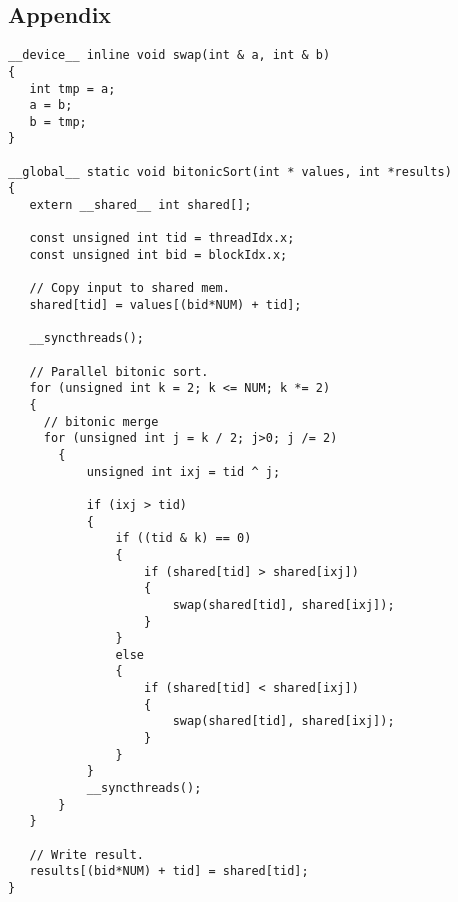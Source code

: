






 





\subsection{Appendix}
\begin{tiny}
\begin{verbatim}
__device__ inline void swap(int & a, int & b)
{
   int tmp = a;
   a = b;
   b = tmp;
}

__global__ static void bitonicSort(int * values, int *results)
{
   extern __shared__ int shared[];

   const unsigned int tid = threadIdx.x;
   const unsigned int bid = blockIdx.x;

   // Copy input to shared mem.
   shared[tid] = values[(bid*NUM) + tid];

   __syncthreads();

   // Parallel bitonic sort.
   for (unsigned int k = 2; k <= NUM; k *= 2)
   { 
     // bitonic merge
     for (unsigned int j = k / 2; j>0; j /= 2)
       {
           unsigned int ixj = tid ^ j;

           if (ixj > tid)
           {
               if ((tid & k) == 0)
               {
                   if (shared[tid] > shared[ixj])
                   {
                       swap(shared[tid], shared[ixj]);
                   }
               }
               else
               {
                   if (shared[tid] < shared[ixj])
                   {
                       swap(shared[tid], shared[ixj]);
                   }
               }
           }
           __syncthreads();
       }
   }

   // Write result.
   results[(bid*NUM) + tid] = shared[tid];
}
\end{verbatim}
\end{tiny}





